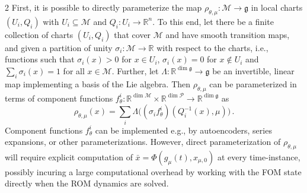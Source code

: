 \documentclass{article}
\newcommand{\M}{\mathcal{M}}                                %
\newcommand{\g}{\mathfrak{g}}                               %
\newcommand{\R}{\mathbb{R}}                                 %
\newcommand{\state}{x}
\newcommand{\appstate}{\bar{x}}
\newcommand{\Coord}{Q}                                      %
\begin{document}
\begin{multicols}{2}
First, it is possible to directly parameterize the map $\rho_{\theta,\mu}:\M\rightarrow\g$ in local charts $(U_i, \Coord_i)$ with $U_i \subseteq \M$ and $\Coord_i:U_i\rightarrow\R^n$. To this end, let there be a finite collection of charts $(U_i,\Coord_i)$ that cover $\M$ and have smooth transition maps, and given a partition of unity $\sigma_i:\M\rightarrow\R$ with respect to the charts, i.e., functions such that $\sigma_i(\state) > 0$ for $\state \in U_i$, $\sigma_i(\state) = 0$ for $x \notin U_i$ and $\sum_i \sigma_i(\state) = 1$ for all $\state \in \M$. Further, let $\Lambda:\R^{\dim \g}\rightarrow \g$ be an invertible, linear map implementing a basis of the Lie algebra. Then $\rho_{\theta,\mu}$ can be parameterized in terms of component functions $f^i_\theta:\R^{\dim \M}\times \R^{\dim \mathcal{P}} \rightarrow \R^{\dim \g}$ as 
\begin{equation}
    \rho_{\theta,\mu}(\state) = \sum_i \Lambda\big((\sigma_i f^i_\theta)(\Coord_i^{-1}(\state),\mu)\big)\,.
\end{equation}
Component functions $f^i_\theta$ can be implemented e.g., by autoencoders, series expansions, or other parameterizations. However, direct parameterization of $\rho_{\theta,\mu}$ will require explicit computation of $\appstate = \Phi(g_\mu(t),\state_{\mu,0})$ at every time-instance, possibly incuring a large computational overhead by working with the FOM state directly when the ROM dynamics are solved. 


\end{multicols}
\end{document}
